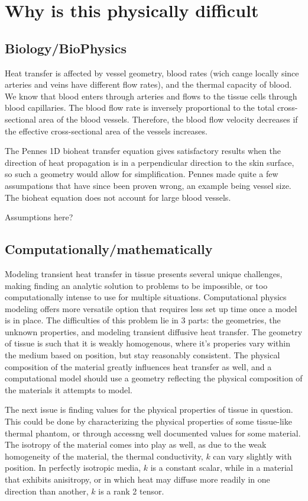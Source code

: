 \documentclass[12pt]{article}
\begin{document}
\section{Why is this physically difficult}

\subsection{Biology/BioPhysics}
Heat transfer is affected by vessel geometry, blood rates (wich cange locally since arteries and veins have different flow rates), and the thermal capacity of blood. We know that blood enters through arteries and flows to the tissue cells through blood capillaries. The blood flow rate is inversely proportional to the total cross-sectional area of the blood vessels. Therefore, the blood flow velocity decreases if the effective cross-sectional area of the vessels increases. 

The Pennes 1D bioheat transfer equation gives satisfactory results when the direction of heat propagation is in a perpendicular direction to the skin surface, so such a geometry would allow for simplification. 
Pennes made quite a few assumpations that have since been proven wrong, an example being vessel size. The bioheat equation does not account for large blood vessels. 

Assumptions here? 
	
\subsection{Computationally/mathematically}
Modeling transient heat transfer in tissue presents several unique challenges, making finding an analytic solution to problems to be impossible, or too computationally intense to use for multiple situations. Computational physics modeling offers more versatile option that requires less set up time once a model is in place. The difficulties of this problem lie in 3 parts: the geometries, the unknown properties, and modeling transient diffusive heat transfer.
The geometry of tissue is such that it is weakly homogenous, where it's properies vary within the medium based on position, but stay reasonably consistent. The physical composition of the material greatly influences heat transfer as well, and a computational model should use a geometry reflecting the physical composition of the materials it attempts to model. 

The next issue is finding values for the physical properties of tissue in question. This could be done by characterizing the physical properties of some tissue-like thermal phantom, or through accessng well documented values for some material. The isotropy of the material comes into play as well, as due to the weak homogeneity of the material, the thermal conductivity, $k$ can vary slightly with position. In perfectly isotropic media, $k$ is a constant scalar, while in a material that exhibits anisitropy, or in which heat may diffuse more readily in one direction than another, $k$ is a rank 2 tensor. 
\end{document}
